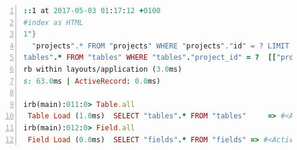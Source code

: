 \documentclass[a4paper,12pt]{article}
\begin{document}
\begin{lstlisting}[frame=single,numbers=left,language = ruby,caption= {Rails console query for table and field existance}, label={code:conex}]
::1 at 2017-05-03 01:17:12 +0100
#index as HTML
1"}
  "projects".* FROM "projects" WHERE "projects"."id" = ? LIMIT 1  [["id", 1]]
tables".* FROM "tables" WHERE "tables"."project_id" = ?  [["project_id", 1]]
rb within layouts/application (3.0ms)
s: 63.0ms | ActiveRecord: 0.0ms)

irb(main):011:0> Table.all  
 Table Load (1.0ms)  SELECT "tables".* FROM "tables"     => #<ActiveRecord::Relation [#<Table id: 2, name: "Store", description: "Store Information", project_id: 1, created_at: "2017-04-24 22:17:38", updated_at: "2017-04-24 22:17:38">, #<Table id: 3, name: "Vehicle", description: "Vehicle Information", project_id: 1, created_at: "2017-04-24 22:17:38", updated_at: "2017-04-24 22:17:38">]> 
irb(main):012:0> Field.all
 Field Load (0.0ms)  SELECT "fields".* FROM "fields" => #<ActiveRecord::Relation []> 
\end{lstlisting}



\end{document}
